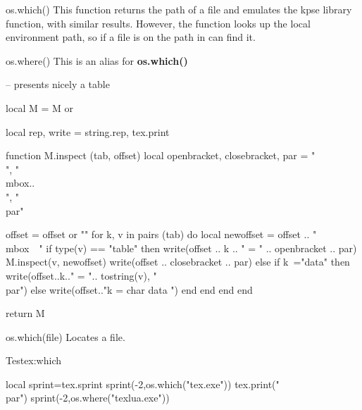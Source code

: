 



\def\function#1{\leavevmode\noindent{\color{teal}
\parindent0pt\leavevmode\par \bfseries #1 }}
 
 
\begin{docLua}{os.which()}  
This function returns the path of a file and emulates the kpse library function, with similar results. However, the function looks up the local environment path, so if a file is on the path in can find it.
\end{docLua}



\begin{docLua}{os.where()} 
This is an alias for \textbf{os.which()}
\end{docLua}



\begin{teXXX}

-- presents nicely a table 

local M = M or {}

local rep, write = string.rep, tex.print

function M.inspect (tab, offset)
   local openbracket, closebracket, par = "\\{", "\\mbox{..}\\}", "\\par"
   
    offset = offset or ""
    for k, v in pairs (tab) do
        local newoffset = offset .. "\\mbox{~~}"
        if type(v) == "table" then
           write(offset .. k .. " = " .. openbracket .. par)
           M.inspect(v, newoffset)
           write(offset .. closebracket .. par)
        else
         if k~="data" then write(offset..k.." =  ".. tostring(v), "\\par") 
           else
                 write(offset.."k = char data ")
           end
       end
    end
end

return M
\end{teXXX}

\begin{docLua}{os.which(file)}
Locates a file.
\end{docLua}

\begin{texexample}{Test}{ex:which}
\begin{luacode}
local sprint=tex.sprint
sprint(-2,os.which("tex.exe"))
tex.print("\\par")
sprint(-2,os.where("texlua.exe"))
\end{luacode}
\end{texexample}

